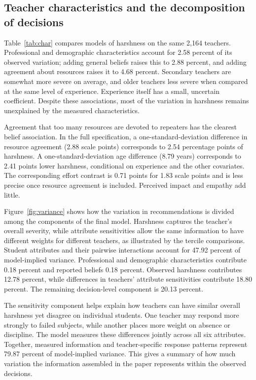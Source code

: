 \subsection{Teacher characteristics and the decomposition of decisions}
Table~\ref{tab:char} compares models of harshness on the same 2,164 teachers. Professional and demographic characteristics account for 2.58 percent of its observed variation; adding general beliefs raises this to 2.88 percent, and adding agreement about resources raises it to 4.68 percent. Secondary teachers are somewhat more severe on average, and older teachers less severe when compared at the same level of experience. Experience itself has a small, uncertain coefficient. Despite these associations, most of the variation in harshness remains unexplained by the measured characteristics.

Agreement that too many resources are devoted to repeaters has the clearest belief association. In the full specification, a one-standard-deviation difference in resource agreement (2.88 scale points) corresponds to 2.54 percentage points of harshness. A one-standard-deviation age difference (8.79 years) corresponds to 2.41 points lower harshness, conditional on experience and the other covariates. The corresponding effort contrast is 0.71 points for 1.83 scale points and is less precise once resource agreement is included. Perceived impact and empathy add little.

Figure~\ref{fig:variance} shows how the variation in recommendations is divided among the components of the final model. Harshness captures the teacher's overall severity, while attribute sensitivities allow the same information to have different weights for different teachers, as illustrated by the tercile comparisons. Student attributes and their pairwise interactions account for 47.92 percent of model-implied variance. Professional and demographic characteristics contribute 0.18 percent and reported beliefs 0.18 percent. Observed harshness contributes 12.78 percent, while differences in teachers' attribute sensitivities contribute 18.80 percent. The remaining decision-level component is 20.13 percent.

The sensitivity component helps explain how teachers can have similar overall harshness yet disagree on individual students. One teacher may respond more strongly to failed subjects, while another places more weight on absence or discipline. The model measures these differences jointly across all six attributes.
Together, measured information and teacher-specific response patterns represent 79.87 percent of model-implied variance. This gives a summary of how much variation the information assembled in the paper represents within the observed decisions.

